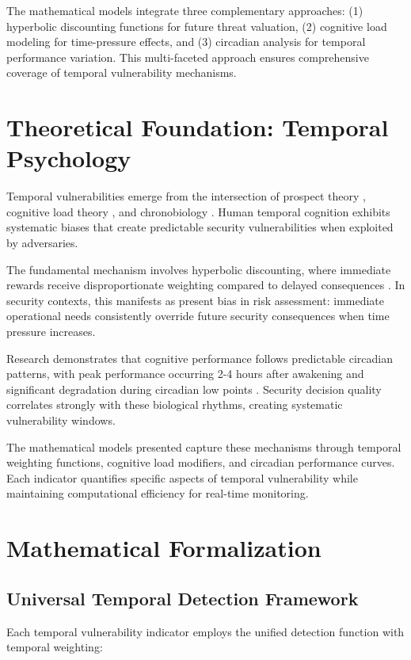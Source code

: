 \documentclass[11pt,a4paper]{article}
\begin{document}
The mathematical models integrate three complementary approaches: (1) hyperbolic discounting functions for future threat valuation, (2) cognitive load modeling for time-pressure effects, and (3) circadian analysis for temporal performance variation. This multi-faceted approach ensures comprehensive coverage of temporal vulnerability mechanisms.

\section{Theoretical Foundation: Temporal Psychology}

Temporal vulnerabilities emerge from the intersection of prospect theory \cite{kahneman1979}, cognitive load theory \cite{sweller1988}, and chronobiology \cite{roenneberg2012}. Human temporal cognition exhibits systematic biases that create predictable security vulnerabilities when exploited by adversaries.

The fundamental mechanism involves hyperbolic discounting, where immediate rewards receive disproportionate weighting compared to delayed consequences \cite{ainslie2001}. In security contexts, this manifests as present bias in risk assessment: immediate operational needs consistently override future security consequences when time pressure increases.

Research demonstrates that cognitive performance follows predictable circadian patterns, with peak performance occurring 2-4 hours after awakening and significant degradation during circadian low points \cite{schmidt2007}. Security decision quality correlates strongly with these biological rhythms, creating systematic vulnerability windows.

The mathematical models presented capture these mechanisms through temporal weighting functions, cognitive load modifiers, and circadian performance curves. Each indicator quantifies specific aspects of temporal vulnerability while maintaining computational efficiency for real-time monitoring.

\section{Mathematical Formalization}

\subsection{Universal Temporal Detection Framework}

Each temporal vulnerability indicator employs the unified detection function with temporal weighting:
\end{document}
